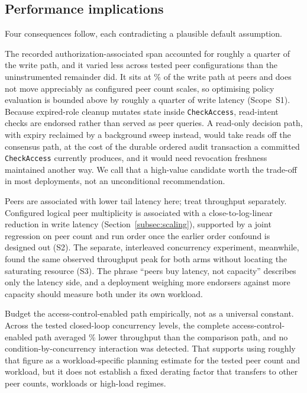 \documentclass[a4paper,fleqn]{cas-sc}
\begin{document}
\subsection{Performance implications}
\label{subsec:implications}

Four consequences follow, each contradicting a plausible default
assumption.

The recorded authorization-associated span accounted for roughly a quarter
of the write path, and it varied less across tested peer configurations
than the uninstrumented remainder did. It sits at \PartAccessPct\% of the
write path at \ScaleMinPeers{} peers and does not move appreciably as
configured peer count scales, so optimising policy evaluation is bounded
above by roughly a quarter of write latency (Scope~S1). Because
expired-role cleanup mutates state inside \texttt{CheckAccess}, read-intent
checks are endorsed rather than served as peer queries. A read-only
decision path, with expiry reclaimed by a background sweep instead, would
take reads off the consensus path, at the cost of the durable ordered audit
transaction a committed \texttt{CheckAccess} currently produces, and it
would need revocation freshness maintained another way. We call that a
high-value candidate worth the trade-off in most deployments, not an
unconditional recommendation.

Peers are associated with lower tail latency here; treat throughput
separately. Configured logical peer multiplicity is associated with a
close-to-log-linear reduction in write latency (Section~\ref{subsec:scaling}),
supported by a joint regression on peer count and run order once the
earlier order confound is designed out (S2). The separate, interleaved
concurrency experiment, meanwhile, found the same observed throughput peak
for both arms without locating the saturating resource (S3). The phrase
``peers buy latency, not capacity'' describes only the latency side, and a
deployment weighing more endorsers against more capacity should measure
both under its own workload.

Budget the access-control-enabled path empirically, not as a universal
constant. Across the tested closed-loop concurrency levels, the complete
access-control-enabled path averaged \OverheadMeanPct\% lower throughput
than the comparison path, and no condition-by-concurrency interaction was
detected. That supports using roughly that figure as a workload-specific
planning estimate for the tested peer count and workload, but it does not
establish a fixed derating factor that transfers to other peer counts,
workloads or high-load regimes.
\end{document}
